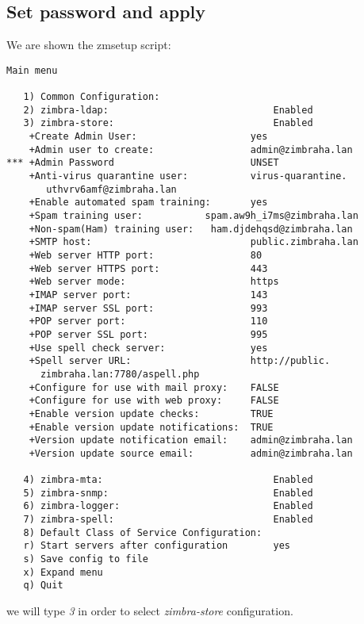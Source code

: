 \subsection {Set password and apply}
We are shown the zmsetup script:
\begin{verbatim}
Main menu

   1) Common Configuration:                                                  
   2) zimbra-ldap:                             Enabled                       
   3) zimbra-store:                            Enabled                       
    +Create Admin User:                    yes                           
    +Admin user to create:                 admin@zimbraha.lan            
*** +Admin Password                        UNSET                         
    +Anti-virus quarantine user:           virus-quarantine.
       uthvrv6amf@zimbraha.lan
    +Enable automated spam training:       yes                           
    +Spam training user:           spam.aw9h_i7ms@zimbraha.lan   
    +Non-spam(Ham) training user:   ham.djdehqsd@zimbraha.lan     
    +SMTP host:                            public.zimbraha.lan           
    +Web server HTTP port:                 80                            
    +Web server HTTPS port:                443                           
    +Web server mode:                      https                         
    +IMAP server port:                     143                           
    +IMAP server SSL port:                 993                           
    +POP server port:                      110                           
    +POP server SSL port:                  995                           
    +Use spell check server:               yes                           
    +Spell server URL:                     http://public.
      zimbraha.lan:7780/aspell.php
    +Configure for use with mail proxy:    FALSE                         
    +Configure for use with web proxy:     FALSE                         
    +Enable version update checks:         TRUE                          
    +Enable version update notifications:  TRUE                          
    +Version update notification email:    admin@zimbraha.lan            
    +Version update source email:          admin@zimbraha.lan            

   4) zimbra-mta:                              Enabled                       
   5) zimbra-snmp:                             Enabled                       
   6) zimbra-logger:                           Enabled                       
   7) zimbra-spell:                            Enabled                       
   8) Default Class of Service Configuration:                                
   r) Start servers after configuration        yes                           
   s) Save config to file                                                    
   x) Expand menu                                                            
   q) Quit
\end{verbatim}
we will type \textit{3} in order to select \textit {zimbra-store} configuration.

